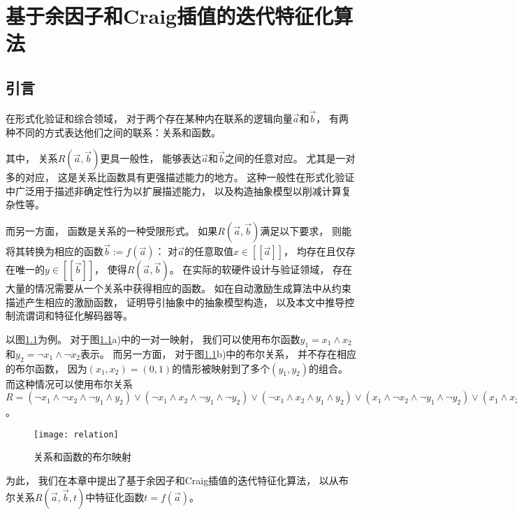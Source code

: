 \chapter{基于余因子和Craig插值的迭代特征化算法}
\label{chap:interative_craig}



\section{引言}

在形式化验证和综合领域，
对于两个存在某种内在联系的逻辑向量$\vec{a}$和$\vec{b}$，
有两种不同的方式表达他们之间的联系：关系和函数。

其中，
关系$R(\vec{a},\vec{b})$更具一般性，
能够表达$\vec{a}$和$\vec{b}$之间的任意对应。
尤其是一对多的对应，
这是关系比函数具有更强描述能力的地方。
这种一般性在形式化验证中广泛用于描述非确定性行为以扩展描述能力，
以及构造抽象模型以削减计算复杂性等。

而另一方面，
函数是关系的一种受限形式。
如果$R(\vec{a},\vec{b})$满足以下要求，
则能将其转换为相应的函数$\vec{b}:=f(\vec{a})$：
对$\vec{a}$的任意取值$x\in[\![\vec{a}]\!]$，
均存在且仅存在唯一的$y\in[\![\vec{b}]\!]$，
使得$R(\vec{a},\vec{b})$。
在实际的软硬件设计与验证领域，
存在大量的情况需要从一个关系中获得相应的函数。
如在自动激励生成算法中从约束描述产生相应的激励函数，
证明导引抽象中的抽象模型构造，
以及本文中推导控制流谓词和特征化解码器等。

以图\ref{fig_relation}为例。
对于图\ref{fig_relation}a)中的一对一映射，
我们可以使用布尔函数$y_1=x_1\wedge x_2$和$y_2=\neg x_1\wedge \neg x_2$表示。
而另一方面，
对于图\ref{fig_relation}b)中的布尔关系，
并不存在相应的布尔函数，
因为$(x_1,x_2)=(0,1)$的情形被映射到了多个$(y_1,y_2)$的组合。
而这种情况可以使用布尔关系$R=(\neg x_1\wedge\neg x_2\wedge \neg y_1\wedge y_2)
\vee(\neg x_1\wedge x_2\wedge \neg y_1\wedge \neg y_2)
\vee(\neg x_1\wedge x_2\wedge y_1\wedge y_2)
\vee(x_1\wedge \neg x_2\wedge \neg y_1 \wedge \neg y_2)
\vee(x_1\wedge x_2\wedge y_1\wedge \neg y_2)$。

\begin{figure}[t]
\begin{center}
\texttt{[image: relation]}
\end{center}
\caption{关系和函数的布尔映射}
  \label{fig_relation}
\end{figure}

为此，
我们在本章中提出了基于余因子和Craig插值的迭代特征化算法，
以从布尔关系$R(\vec{a},\vec{b},t)$中特征化函数$t=f(\vec{a})$。


